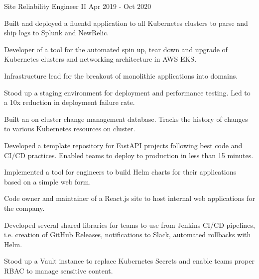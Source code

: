 \begin{cventries}
  \cventry
    {Site Reliability Engineer II} %
    {} %
    {} %
    {Apr 2019 - Oct 2020} %
    {
      \begin{cvitems} %
        \item {Built and deployed a fluentd application to all Kubernetes clusters to parse and ship logs to Splunk and NewRelic.}
        \item {Developer of a tool for the automated spin up, tear down and upgrade of Kubernetes clusters and networking architecture in AWS EKS.}
        \item {Infrastructure lead for the breakout of monolithic applications into domains.}
        \item {Stood up a staging environment for deployment and performance testing. Led to a 10x reduction in deployment failure rate.}
        \item {Built an on cluster change management database. Tracks the history of changes to various Kubernetes resources on cluster.}
        \item {Developed a template repository for FastAPI projects following best code and CI/CD practices. Enabled teams to deploy to production in less than 15 minutes.}
        \item {Implemented a tool for engineers to build Helm charts for their applications based on a simple web form.}
        \item {Code owner and maintainer of a React.js site to host internal web applications for the company.}
        \item {Developed several shared libraries for teams to use from Jenkins CI/CD pipelines, i.e. creation of GitHub Releases, notifications to Slack, automated rollbacks with Helm.}
        \item {Stood up a Vault instance to replace Kubernetes Secrets and enable teams proper RBAC to manage sensitive content.}
      \end{cvitems}
    }



\end{cventries}
